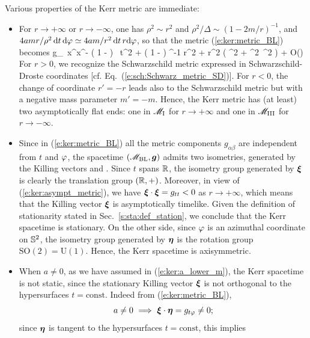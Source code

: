 Various properties of the Kerr metric are immediate:
\begin{itemize}
\item For $r\rightarrow+\infty$ or $r\rightarrow-\infty$, one has $\rho^2\sim r^2$ and
$\rho^2/\Delta \sim (1-2m/r)^{-1}$,
and $4 a m  r / \rho^2\,  \mathrm{d} t\, \mathrm{d}\varphi \simeq 4 a m/r^2 \,  \mathrm{d} t\, r\mathrm{d}\varphi$,
so that the metric (\ref{e:ker:metric_BL}) becomes
\be \label{e:ker:asympt_metric}
    g_{\mu\nu}\,  \D x^\mu \D x^\nu  \simeq  - \left( 1 -  \right) \, \D t^2
    + \left( 1 -  \right) ^{-1} \D r^2
    + r^2 \left( \D \th^2 + \sin^2\th  \, \D \ph^2 \right)
    + O\left(\right)
\ee
For $r>0$, we recognize the Schwarzschild metric expressed
in Schwarzschild-Droste coordinates [cf. Eq.~(\ref{e:sch:Schwarz_metric_SD})].
For $r<0$, the change of coordinate $r'=-r$ leads also to the Schwarzschild metric
but with a negative mass parameter $m'=-m$.
Hence, the Kerr metric has (at least) two asymptotically flat ends: one in
$\mathscr{M}_{\rm I}$ for $r\rightarrow + \infty$ and one in $\mathscr{M}_{\rm III}$ for
$r\rightarrow - \infty$.
\item Since in (\ref{e:ker:metric_BL}) all the metric components $g_{\alpha\beta}$ are independent from $t$ and $\varphi$, the
spacetime $(\mathscr{M}_{\rm BL},\bm{g})$ admits two isometries, generated by the Killing
vectors
\be
     \quad\mbox{and}\quad
    \encadre{\w{\eta} := \wpar_\ph}.
\ee
Since $t$ spans $\mathbb{R}$, the isometry group generated by $\bm{\xi}$ is clearly
the translation group $(\mathbb{R},+)$. Moreover, in
view of (\ref{e:ker:asympt_metric}), we have $\bm{\xi}\cdot\bm{\xi} = g_{tt} < 0$
as $r\rightarrow +\infty$, which means that the Killing vector $\bm{\xi}$
is asymptotically timelike. Given the definition of stationarity stated in
Sec.~\ref{s:sta:def_station}, we conclude that the Kerr spacetime is
stationary.
On the other side, since $\varphi$ is an azimuthal coordinate
on $\mathbb{S}^2$, the isometry group generated by $\bm{\eta}$ is the rotation
group $\mathrm{SO}(2) = \mathrm{U}(1)$.
Hence, the Kerr spacetime is axisymmetric.
\item When $a\not=0$, as we have assumed in (\ref{e:ker:a_lower_m}), the
Kerr spacetime is not static, since the stationary Killing vector $\bm{\xi}$
is not orthogonal to the hypersurfaces $t=\mathrm{const}$. Indeed
from (\ref{e:ker:metric_BL}),
\[
    a\not=0 \ \Longrightarrow \ \bm{\xi}\cdot\bm{\eta} = g_{t\varphi} \not=0 ;
\]
since $\bm{\eta}$ is tangent to the hypersurfaces $t=\mathrm{const}$, this implies

\end{itemize}
